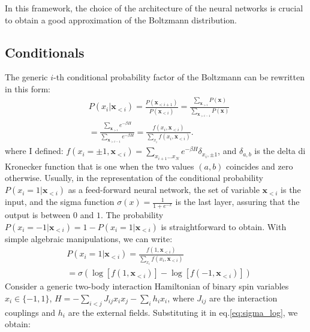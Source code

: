 \documentclass[aps,physrev,10pt,floatfix,reprint]{revtex4-2}
\begin{document}
In this framework, the choice of the architecture of the neural networks is crucial to obtain a good approximation of the Boltzmann distribution.

\subsection{Conditionals}
The generic $i$-th conditional probability factor of the Boltzmann can be rewritten in this form: 
\begin{equation}
    \label{eq:chain}
    \begin{split}
    & P\left(x_{i}|\mathbf{x}_{<i}\right)  = 
    \frac{P\left(\mathbf{x}_{<i+1}\right)}{P\left(\mathbf{x}_{<i}\right)}  = 
    \frac{\sum_{\mathbf{x}_{>i}}P\left(\mathbf{x}\right)}{\sum_{\mathbf{x}_{>i-1}}P\left(\mathbf{x}\right)} \\
    &=\frac{\sum_{\mathbf{x}_{>i}}e^{-\beta H}}{\sum_{\mathbf{x}_{>i-1}}e^{-\beta H}}  = 
    \frac{f\left(x_{i},\mathbf{x}_{<i}\right)}{\sum_{x_{i}}f\left(x_{i},\mathbf{x}_{<i}\right)}.
    \end{split}
\end{equation}
where I defined: $f\left(x_{i}=\pm 1,\mathbf{x}_{<i}\right) = \sum_{x_{i+1}\dots x_{N}}e^{-\beta H}\delta_{x_i, \pm1}$, and $\delta_{a,b}$ is the delta di Kronecker function that is one when the two values $(a,b)$ coincides and zero otherwise. Usually, in the representation of the conditional probability $P\left(x_{i}=1|\mathbf{x}_{<i}\right)$ as a feed-forward neural network, the set of variable $\mathbf{x}_{<i}$ is the input, and the sigma function $\sigma(x)=\frac{1}{1+e^{-x}}$ is the last layer, assuring that the output is between $0$ and $1$. The probability $P\left(x_{i}=-1|\mathbf{x}_{<i}\right) = 1 - P\left(x_{i}=1|\mathbf{x}_{<i}\right)$ is straightforward to obtain. With simple algebraic manipulations, we can write: 
\begin{equation}
    \label{eq:sigma_log}
    \begin{split}
    & P\left(x_{i}=1|\mathbf{x}_{<i}\right) = \frac{f\left(1,\mathbf{x}_{<i}\right)}{\sum_{x_{i}}f\left(x_{i},\mathbf{x}_{<i}\right)}\\
    &= \sigma\left(\log\left[f\left(1,\mathbf{x}_{<i}\right)\right]-\log\left[f\left(-1,\mathbf{x}_{<i}\right)\right]\right)
    \end{split}
\end{equation}
Consider a generic two-body interaction Hamiltonian of binary spin variables $x_i \in \{-1,1\}$, $H = -\sum_{i<j} J_{ij} x_i x_j - \sum_{i} h_i x_i$, where $J_{ij}$ are the interaction couplings and $h_i$ are the external fields. Substituting it in eq.\ref{eq:sigma_log}, we obtain:
\end{document}

